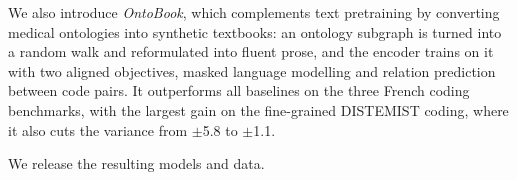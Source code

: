 We also introduce \emph{OntoBook}, which complements text pretraining by converting
medical ontologies into synthetic textbooks: an ontology subgraph is turned into a
random walk and reformulated into fluent prose, and the encoder trains on it with
two aligned objectives, masked language modelling and relation prediction between
code pairs. It outperforms all baselines on the three French coding benchmarks, with
the largest gain on the fine-grained DISTEMIST coding, where it also cuts the
variance from $\pm$5.8 to $\pm$1.1.

We release the resulting models and data.
